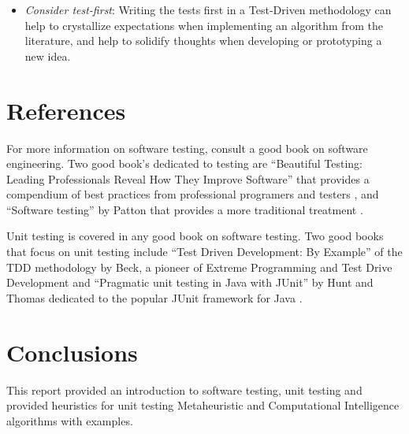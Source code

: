 \documentclass[a4paper, 11pt]{article}
\begin{document}
\begin{itemize}
	\item \emph{Consider test-first}: Writing the tests first in a Test-Driven methodology can help to crystallize expectations when implementing an algorithm from the literature, and help to solidify thoughts when developing or prototyping a new idea.
\end{itemize}

% 
% 
\section{References}
\label{sec:refs}
For more information on software testing, consult a good book on software engineering. Two good book's dedicated to testing are ``Beautiful Testing: Leading Professionals Reveal How They Improve Software'' that provides a compendium of best practices from professional programers and testers \cite{Goucher2009}, and ``Software testing'' by Patton that provides a more traditional treatment \cite{Patton2005}.

Unit testing is covered in any good book on software testing.
Two good books that focus on unit testing include ``Test Driven Development: By Example'' of the TDD methodology by Beck, a pioneer of Extreme Programming and Test Drive Development \cite{Beck2002} and ``Pragmatic unit testing in Java with JUnit'' by Hunt and Thomas dedicated to the popular JUnit framework for Java \cite{Hunt2003}.

\section{Conclusions}
\label{sec:conclusions}
This report provided an introduction to software testing, unit testing and provided heuristics for unit testing Metaheuristic and Computational Intelligence algorithms with examples.




\end{document}
